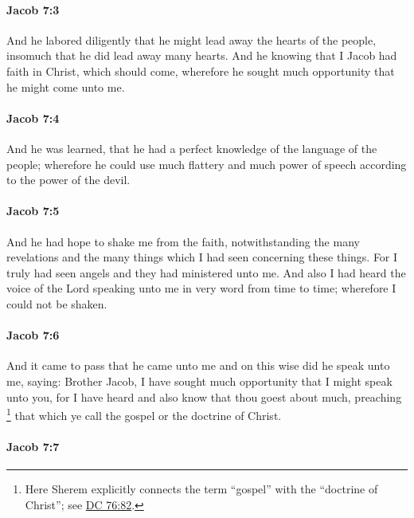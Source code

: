 		\paragraph{Jacob 7:3} %
			\label{JACOB-7-3}

			And he labored diligently that he might lead away the hearts of the people,
			insomuch that he did lead away many hearts.
			And he knowing that I Jacob had faith in Christ, which should come,
			wherefore he sought much opportunity that he might come unto me.

		\paragraph{Jacob 7:4} %
			\label{JACOB-7-4}

			And he was learned,
			that he had a perfect knowledge of the language of the people;
			wherefore he could use much flattery
			and much power of speech according to the power of the devil.

		\paragraph{Jacob 7:5} %
			\label{JACOB-7-5}

			And he had hope to shake me from the faith,
			notwithstanding the many revelations
			and the many things which I had seen concerning these things.
			For I truly had seen angels and they had ministered unto me.
			And also I had heard the voice of the Lord speaking unto me
			in very word from time to time;
			wherefore I could not be shaken.

		\paragraph{Jacob 7:6} %
			\label{JACOB-7-6}

			And it came to pass that he came unto me
			and on this wise did he speak unto me, saying:
			Brother Jacob, I have sought much opportunity that I might speak unto you,
			for I have heard and also know that thou goest about much,
			preaching
				\footnote{%
					Here Sherem explicitly connects the term ``gospel'' with the ``doctrine of Christ''; see \hyperref[DC76-82]{DC 76:82}.
					}%
			that which ye call the gospel or the doctrine of Christ.

		\paragraph{Jacob 7:7} %
			\label{JACOB-7-7}

